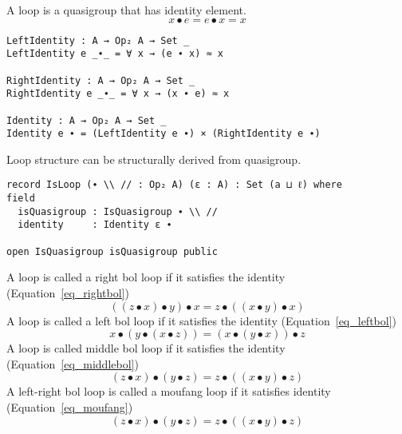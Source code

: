 A loop is a quasigroup that has identity element.
\begin{equation}\label{eq_lineslope}
x ∙ e = e ∙ x = x
\end{equation}

\begin{verbatim}
LeftIdentity : A → Op₂ A → Set _
LeftIdentity e _∙_ = ∀ x → (e ∙ x) ≈ x

RightIdentity : A → Op₂ A → Set _
RightIdentity e _∙_ = ∀ x → (x ∙ e) ≈ x

Identity : A → Op₂ A → Set _
Identity e ∙ = (LeftIdentity e ∙) × (RightIdentity e ∙)
\end{verbatim}

Loop structure can be structurally derived from quasigroup.

\begin{verbatim}
record IsLoop (∙ \\ // : Op₂ A) (ε : A) : Set (a ⊔ ℓ) where
field
  isQuasigroup : IsQuasigroup ∙ \\ //
  identity     : Identity ε ∙

open IsQuasigroup isQuasigroup public
\end{verbatim}

\begin{comment}
  identity\textsuperscript{l} : LeftIdentity ε ∙
  identity\textsuperscript{l} = proj\textsubscript{1} identity

  identity\textsuperscript{r} : RightIdentity ε ∙
  identity\textsuperscript{r} = proj\textsubscript{2} identity
\end{comment}

A loop is called a right bol loop if it satisfies the identity
(Equation~\ref{eq_rightbol})
\begin{equation}\label{eq_rightbol}
 ((z ∙ x) ∙ y) ∙ x = z ∙ ((x ∙ y) ∙ x)
\end{equation}
A loop is called a left bol loop if it satisfies the identity
(Equation~\ref{eq_leftbol})
\begin{equation}\label{eq_leftbol}
 x ∙ (y ∙ (x ∙ z)) = (x ∙ (y ∙ x)) ∙ z
\end{equation}
A loop is called middle bol loop if it satisfies the identity
(Equation~\ref{eq_middlebol}) 
\begin{equation}\label{eq_middlebol}
(z ∙ x) ∙ (y ∙ z) = z ∙ ((x ∙ y) ∙ z)
\end{equation}
A left-right bol loop is called a moufang loop if it satisfies identity
(Equation~\ref{eq_moufang})
\begin{equation}\label{eq_moufang}
(z ∙ x) ∙ (y ∙ z) = z ∙ ((x ∙ y) ∙ z)
\end{equation} 


